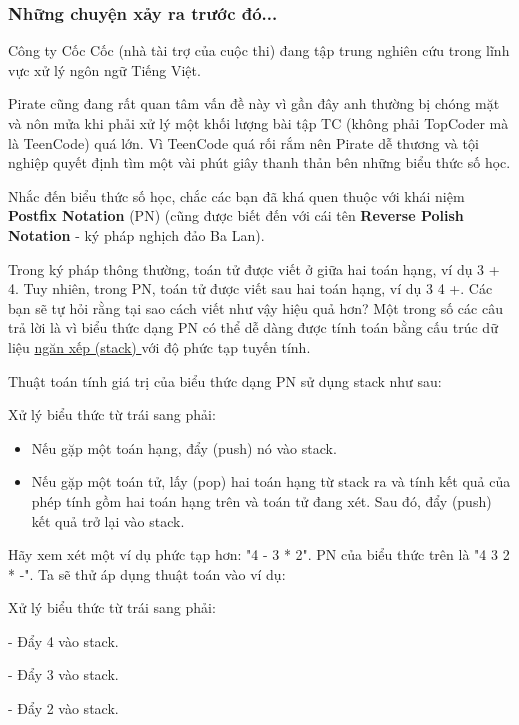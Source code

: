 



\subsubsection{   Những chuyện xảy ra trước đó...  }

   Công ty Cốc Cốc (nhà tài trợ của cuộc thi) đang tập trung nghiên cứu trong lĩnh vực xử lý ngôn ngữ Tiếng Việt.  

   Pirate cũng đang rất quan tâm vấn đề này vì gần đây anh thường bị chóng mặt và nôn mửa khi phải xử lý một khối lượng bài tập TC (không phải TopCoder mà là TeenCode) quá lớn. Vì TeenCode quá rối rắm nên Pirate dễ thương và tội nghiệp quyết định tìm một vài phút giây thanh thản bên những biểu thức số học.  

   Nhắc đến biểu thức số học, chắc các bạn đã khá quen thuộc với khái niệm   \textbf{    Postfix Notation   }   (PN) (cũng được biết đến với cái tên   \textbf{    Reverse Polish Notation   }   - ký pháp nghịch đảo Ba Lan).  

   Trong ký pháp thông thường, toán tử được viết ở giữa hai toán hạng, ví dụ 3 + 4. Tuy nhiên, trong PN, toán tử được viết sau hai toán hạng, ví dụ 3 4 +. Các bạn sẽ tự hỏi rằng tại sao cách viết như vậy hiệu quả hơn? Một trong số các câu trả lời là vì biểu thức dạng PN có thể dễ dàng được tính toán bằng cấu trúc dữ liệu   \href{http://www.cosc.canterbury.ac.nz/mukundan/dsal/StackAppl.html}{    ngăn xếp (stack)   }   với độ phức tạp tuyến tính.  

   Thuật toán tính giá trị của biểu thức dạng PN sử dụng stack như sau:  

Xử lý biểu thức từ trái sang phải:
\begin{itemize}
	\item Nếu gặp một toán hạng, đẩy (push) nó vào stack.
	\item Nếu gặp một toán tử, lấy (pop) hai toán hạng từ stack ra và tính kết quả của phép tính gồm hai toán hạng trên và toán tử đang xét. Sau đó, đẩy (push) kết quả trở lại vào stack.
\end{itemize}

   Hãy xem xét một ví dụ phức tạp hơn: "4 - 3 * 2". PN của biểu thức trên là "4 3 2 * -". Ta sẽ thử áp dụng thuật toán vào ví dụ:  

Xử lý biểu thức từ trái sang phải:

- Đẩy 4 vào stack.

- Đẩy 3 vào stack.

- Đẩy 2 vào stack.

